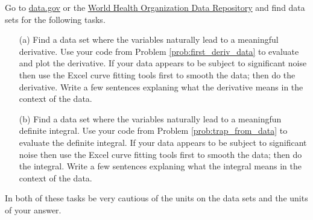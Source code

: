 \begin{problem}
    Go to \href{https://www.data.gov/}{data.gov} or the
    \href{http://apps.who.int/gho/data/?theme=home}{World Health Organization Data
    Repository} and find data sets for the following tasks.
    \begin{enumerate}
        \item[(a)] Find a data set where the variables naturally lead to a meaningful
            derivative.  Use your code from Problem  \ref{prob:first_deriv_data} to
            evaluate and plot the derivative.  If your data appears to be subject to
            significant noise then use the Excel curve fitting tools first to smooth the
            data; then do the derivative.  Write a few sentences explaning what the
            derivative means in the context of the data.
        \item[(b)] Find a data set where the variables naturally lead to a meaningfun
            definite integral.  Use your code from Problem \ref{prob:trap_from_data} to
            evaluate the definite integral.  If your data appears to be subject to
            significant noise then use the Excel curve fitting tools first to smooth the
            data; then do the integral.  Write a few sentences explaning what the
            integral means in the context of the data.
    \end{enumerate}
    In both of these tasks be very cautious of the units on the data sets and the units of
    your answer. 
\end{problem}


